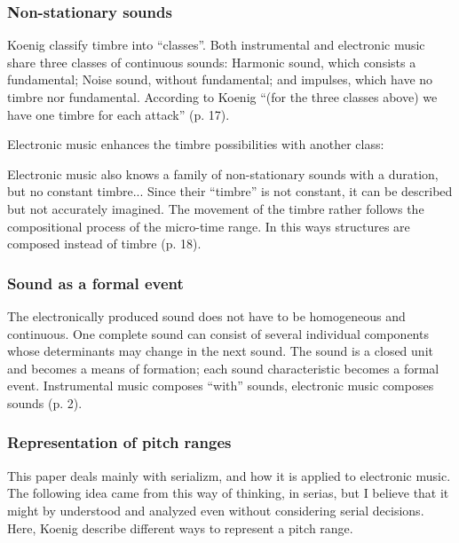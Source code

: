 \documentclass[a4paper,11pt]{article}
\newenvironment{MyShadequote}[1][]{%
    \ignorespaces%
    \begin{mdframed}[style=MyShadeQuoteStyle,#1]%
}{%
    \end{mdframed}%
    \ignorespacesafterend%
}%
\begin{document}
\subsubsection{Non-stationary sounds}
\label{subs:koenig:nonstationary}

Koenig classify timbre into ``classes''.
Both instrumental and electronic music share three classes of continuous sounds:
Harmonic sound, which consists a fundamental; Noise sound, without fundamental; and impulses, which have no timbre nor fundamental.
According to Koenig ``(for the three classes above) we have one timbre for each attack'' (p. 17).

Electronic music enhances the timbre possibilities with another class:

\begin{MyShadequote}
 Electronic music also knows a family of non-stationary sounds with a duration, but no constant timbre...
 Since their ``timbre'' is not constant, it can be described but not accurately imagined.
 The movement of the timbre rather follows the compositional process of the micro-time range.
 In this ways structures are composed instead of timbre (p. 18).
\end{MyShadequote}

\subsubsection{Sound as a formal event}
\label{subs:koenig:event}

\begin{MyShadequote}
  The electronically produced sound does not have to be homogeneous and continuous.
  One complete sound can consist of several individual components whose determinants may change in the next sound.
  The sound is a closed unit and becomes a means of formation;
  each sound characteristic becomes a formal event.
  Instrumental music composes ``with'' sounds, electronic music composes sounds (p. 2).
\end{MyShadequote}

\subsubsection{Representation of pitch ranges}
\label{subs:koenig:pitch_ranges}

This paper deals mainly with serializm, and how it is applied to electronic music.
The following idea came from this way of thinking, in serias, but I believe that it might by understood and analyzed even without considering serial decisions.
Here, Koenig describe different ways to represent a pitch range.
\end{document}
